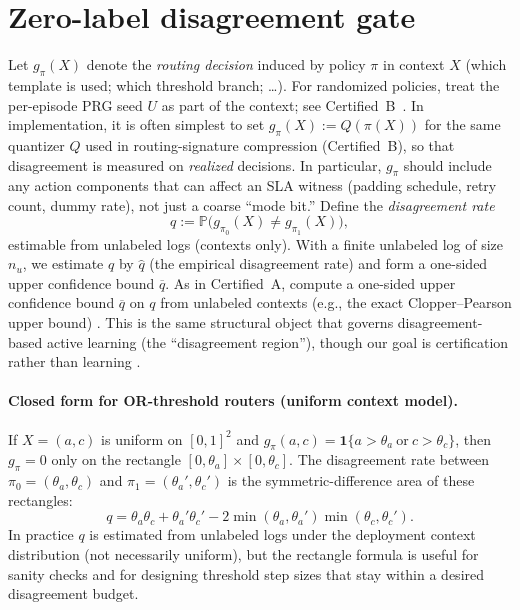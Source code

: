 \documentclass[11pt]{article}
\begin{document}
\section{Zero-label disagreement gate}
Let $g_\pi(X)$ denote the \emph{routing decision} induced by policy $\pi$ in context $X$ (which template is used; which threshold branch; \ldots).
For randomized policies, treat the per-episode PRG seed $U$ as part of the context; see Certified~B~\cite{series:sigcomp}.
In implementation, it is often simplest to set $g_\pi(X):=Q(\pi(X))$ for the same quantizer $Q$ used in routing-signature compression (Certified~B), so that disagreement is measured on \emph{realized} decisions.
In particular, $g_\pi$ should include any action components that can affect an SLA witness (padding schedule, retry count, dummy rate), not just a coarse ``mode bit.''
Define the \emph{disagreement rate}
\[
q := \mathbb{P}\bigl(g_{\pi_0}(X)\neq g_{\pi_1}(X)\bigr),
\]
estimable from unlabeled logs (contexts only).
With a finite unlabeled log of size $n_u$, we estimate $q$ by $\widehat{q}$ (the empirical disagreement rate) and form a one-sided upper confidence bound $\overline{q}$.
As in Certified~A, compute a one-sided upper confidence bound $\overline{q}$ on $q$ from unlabeled contexts (e.g., the exact Clopper--Pearson upper bound) \cite{clopper1934}.
This is the same structural object that governs disagreement-based active learning (the ``disagreement region''), though our goal is certification rather than learning \cite{hanneke2014}.

\paragraph{Closed form for OR-threshold routers (uniform context model).}
If $X=(a,c)$ is uniform on $[0,1]^2$ and $g_{\pi}(a,c)=\mathbf{1}\{a>\theta_a \ \text{or}\ c>\theta_c\}$, then $g_{\pi}=0$ only on the rectangle $[0,\theta_a]\times[0,\theta_c]$.
The disagreement rate between $\pi_0=(\theta_a,\theta_c)$ and $\pi_1=(\theta_a',\theta_c')$ is the symmetric-difference area of these rectangles:
\begin{equation}
q = \theta_a\theta_c + \theta_a'\theta_c' - 2\min(\theta_a,\theta_a')\min(\theta_c,\theta_c').
\label{eq:disagree-area}
\end{equation}
In practice $q$ is estimated from unlabeled logs under the deployment context distribution (not necessarily uniform), but the rectangle formula is useful for sanity checks and for designing threshold step sizes that stay within a desired disagreement budget.
\end{document}
